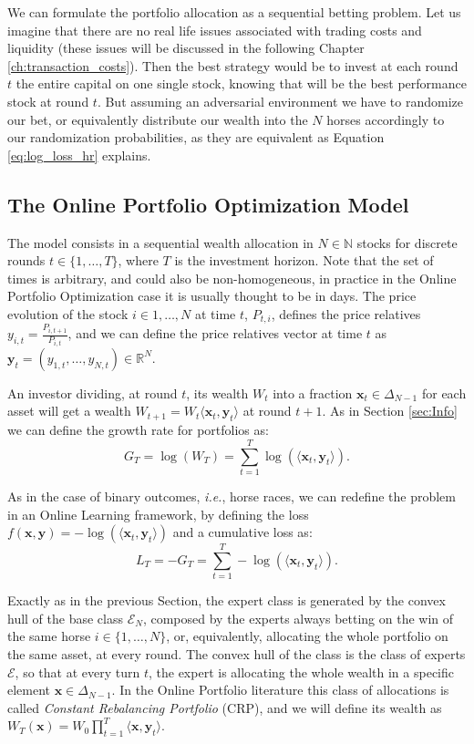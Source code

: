 We can formulate the portfolio allocation as a sequential betting problem. Let us imagine that there are no real life issues associated with trading costs and liquidity (these issues will be discussed in the following Chapter \ref{ch:transaction_costs}). Then the best strategy would be to invest at each round $t$ the entire capital on one single stock, knowing that will be the best performance stock at round $t$. But assuming an adversarial environment we have to randomize our bet, or equivalently distribute our wealth into the $N$ horses accordingly to our randomization probabilities, as they are equivalent as Equation \eqref{eq:log_loss_hr} explains. 

\subsection{The Online Portfolio Optimization Model}

The model consists in a sequential wealth allocation in $N\in\mathbb N$ stocks for discrete rounds $t\in\{1,\ldots,T\}$, where $T$ is the investment horizon. Note that the set of times is arbitrary, and could also be non-homogeneous, in practice in the Online Portfolio Optimization case it is usually thought to be in days. The price evolution of the stock $i\in 1,\ldots,N$ at time $t$, $P_{t,i}$, defines the price relatives $y_{i,t}=\frac{P_{i,t+1}}{P_{i,t}}$, and we can define the price relatives vector at time $t$ as $\mathbf y_t=(y_{1,t},\ldots,y_{N,t})\in\mathbb R^N$. 

An investor dividing, at round $t$, its wealth $W_t$ into a fraction $\mathbf x_t\in\Delta_{N-1}$ for each asset will get a wealth $W_{t+1}=W_t\langle \mathbf x_t,\mathbf y_t\rangle$ at round $t+1$. As in Section \ref{sec:Info} we can define the growth rate for portfolios as:
$$G_T=\log(W_T)=\sum\limits_{t=1}^T\log(\langle\mathbf x_t, \mathbf y_t\rangle).$$

As in the case of binary outcomes, \emph{i.e.}, horse races, we can redefine the problem in an Online Learning framework, by defining the loss $f(\mathbf x,\mathbf y)=-\log(\langle\mathbf x_t, \mathbf y_t\rangle)$ and a cumulative loss as: 
$$L_T=-G_T=\sum\limits_{t=1}^T-\log(\langle\mathbf x_t,\mathbf y_t\rangle).$$

Exactly as in the previous Section, the expert class is generated by the convex hull of the base class $\mathcal E_N$, composed by the experts always betting on the win of the same horse $i\in\{1,\ldots,N\}$, or, equivalently, allocating the whole portfolio on the same asset, at every round. The convex hull of the class is the class of experts $\mathcal E$, so that at every turn $t$, the expert is allocating the whole wealth in a specific element $\mathbf x\in\Delta_{N-1}$. In the Online Portfolio literature this class of allocations is called \emph{Constant Rebalancing Portfolio} (CRP), and we will define its wealth as $W_T(\mathbf x)=W_0\prod\limits_{t=1}^T\langle\mathbf x,\mathbf y_t\rangle$.

